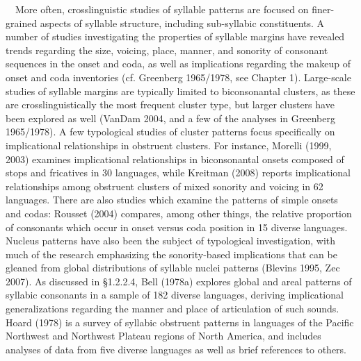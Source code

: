 \documentclass[12pt]{article}
\newenvironment{styleBody}{\renewcommand\baselinestretch{1.0}\setlength\leftskip{0in}\setlength\rightskip{0in plus 1fil}\setlength\parindent{0in}\setlength\parfillskip{0pt plus 1fil}\setlength\parskip{0in plus 1pt}\writerlistparindent\writerlistleftskip\leavevmode\normalfont\normalsize\fontsize{11pt}{13.2pt}\selectfont\mdseries\upshape\writerlistlabel\ignorespaces}{\unskip\vspace{0in plus 1pt}\par}
\newcommand\writerlistleftskip{}
\newcommand\writerlistparindent{}
\newcommand\writerlistlabel{}
\begin{document}
\begin{styleBody}
\ \ More often, crosslinguistic studies of syllable patterns are focused on finer-grained aspects of syllable structure, including sub-syllabic constituents. A number of studies investigating the properties of syllable margins have revealed trends regarding the size, voicing, place, manner, and sonority of consonant sequences in the onset and coda, as well as implications regarding the makeup of onset and coda inventories (cf. Greenberg 1965/1978, see Chapter 1). Large-scale studies of syllable margins are typically limited to biconsonantal clusters, as these are crosslinguistically the most frequent cluster type, but larger clusters have been explored as well (VanDam 2004, and a few of the analyses in Greenberg 1965/1978). A few typological studies of cluster patterns focus specifically on implicational relationships in obstruent clusters. For instance, Morelli (1999, 2003) examines implicational relationships in biconsonantal onsets composed of stops and fricatives in 30 languages, while Kreitman (2008) reports implicational relationships among obstruent clusters of mixed sonority and voicing in 62 languages. There are also studies which examine the patterns of simple onsets and codas: Rousset (2004) compares, among other things, the relative proportion of consonants which occur in onset versus coda position in 15 diverse languages. Nucleus patterns have also been the subject of typological investigation, with much of the research emphasizing the sonority-based implications that can be gleaned from global distributions of syllable nuclei patterns (Blevins 1995, Zec 2007). As discussed in §1.2.2.4, Bell (1978a) explores global and areal patterns of syllabic consonants in a sample of 182 diverse languages, deriving implicational generalizations regarding the manner and place of articulation of such sounds. Hoard (1978) is a survey of syllabic obstruent patterns in languages of the Pacific Northwest and Northwest Plateau regions of North America, and includes analyses of data from five diverse languages as well as brief references to others.
\end{styleBody}
\end{document}
